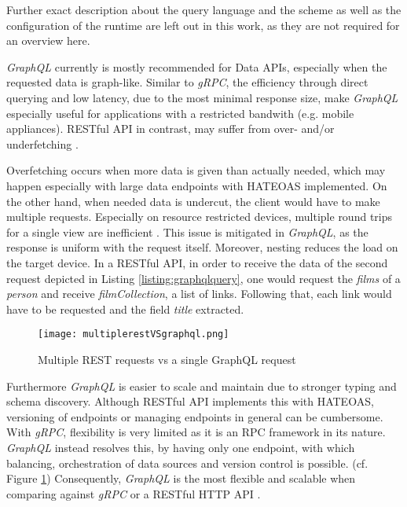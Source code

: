 Further exact description about the query language and the scheme as well as the configuration of the runtime are left out in this work, as they are not required for an overview here.

\textit{GraphQL} currently is mostly recommended for Data \acp{API}, especially when the requested data is graph-like.
Similar to \textit{gRPC}, the efficiency through direct querying and low latency, due to the most minimal response size, make \textit{GraphQL} especially useful for applications with a restricted bandwith (e.g. mobile appliances).
RESTful \ac{API} in contrast, may suffer from over- and/or underfetching \cite[p.~3]{Doerrfeld.2018}.

Overfetching occurs when more data is given than actually needed, which may happen especially with large data endpoints with HATEOAS implemented.
On the other hand, when needed data is undercut, the client would have to make multiple requests.
Especially on resource restricted devices, multiple round trips for a single view are inefficient \cite[p.~12f.]{Buna.2016}\cite[p.~24ff.]{Porcello.2018}.
This issue is mitigated in \textit{GraphQL}, as the response is uniform with the request itself.
Moreover, nesting reduces the load on the target device.
In a RESTful API, in order to receive the data of the second request depicted in Listing \ref{listing:graphqlquery}, one would request the \textit{films} of a \textit{person} and receive \textit{filmCollection}, a list of links.
Following that, each link would have to be requested and the field \textit{title} extracted.

\begin{figure}[h]
	\centering
	\texttt{[image: multiplerestVSgraphql.png]}
	\caption{Multiple REST requests vs a single GraphQL request \cite{Lombard.2018}}
	\label{img:restvsgraphqlrequest}
\end{figure}

Furthermore \textit{GraphQL} is easier to scale and maintain due to stronger typing and schema discovery.
Although RESTful \ac{API} implements this with HATEOAS, versioning of endpoints or managing endpoints in general can be cumbersome.
With \textit{gRPC}, flexibility is very limited as it is an \ac{RPC} framework in its nature.
\textit{GraphQL} instead resolves this, by having only one endpoint, with which balancing, orchestration of data sources and version control is possible. (cf. Figure \ref{img:restvsgraphqlrequest})
Consequently, \textit{GraphQL} is the most flexible and scalable when comparing against \textit{gRPC} or a RESTful \ac{HTTP} \ac{API} \cite[p.~29]{Porcello.2018}\cite[p.~11]{Buna.2016}.

